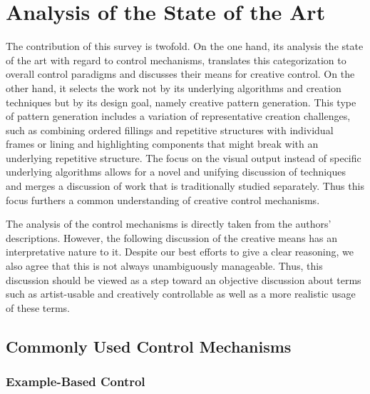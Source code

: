 

\section{Analysis of the State of the Art}
\label{sec:analysis}


The contribution of this survey is twofold. On the one hand, its analysis the state of the art with regard to control mechanisms, translates this categorization to overall control paradigms and discusses their means for creative control. On the other hand, it selects the work not by its underlying algorithms and creation techniques but by its design goal, namely creative pattern generation. This type of pattern generation includes a variation of representative creation challenges, such as combining ordered fillings and repetitive structures with individual frames or lining and highlighting components that might break with an underlying repetitive structure. The focus on the visual output instead of specific underlying algorithms allows for a novel and unifying discussion of techniques and merges a discussion of work that is traditionally studied separately. Thus this focus furthers a common understanding of creative control mechanisms.

The analysis of the control mechanisms is directly taken from the authors' descriptions. However, the following discussion of the creative means has an interpretative nature to it. Despite our best efforts to give a clear reasoning, we also agree that this is not always unambiguously manageable. Thus, this discussion should be viewed as a step toward an objective discussion about terms such as artist-usable and creatively controllable as well as a more realistic usage of these terms.


\subsection{Commonly Used Control Mechanisms}
\label{subsec:commonly_used_control_mechanisms}


\subsubsection{Example-Based Control}
\label{subsubsec:commonly_used_control_mechanisms_example}

